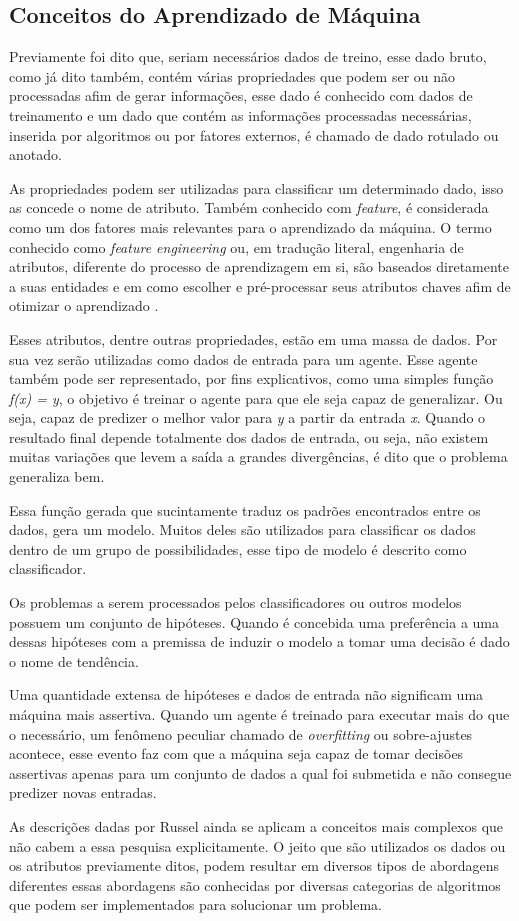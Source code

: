 \subsection{Conceitos do Aprendizado de Máquina}
Previamente foi dito que, seriam necessários dados de treino, esse dado bruto, como já dito também, contém várias propriedades que podem ser ou não processadas afim de gerar informações, esse dado é conhecido com dados de treinamento e um dado que contém as informações processadas necessárias, inserida por algoritmos ou por fatores externos, é chamado de dado rotulado ou anotado.

As propriedades podem ser utilizadas para classificar um determinado dado, isso as concede o nome de atributo. Também conhecido com \textit{feature}, é considerada como um dos fatores mais relevantes para o aprendizado da máquina. O termo conhecido como \textit{feature engineering} ou, em tradução literal, engenharia de atributos, diferente do processo de aprendizagem em si, são baseados diretamente a suas entidades e em como escolher e pré-processar seus atributos chaves afim de otimizar o aprendizado \cite{domingos2012few}.

Esses atributos, dentre outras propriedades, estão em uma massa de dados. Por sua vez serão utilizadas como dados de entrada para um agente. Esse agente também pode ser representado, por fins explicativos, como uma simples função \textit{f(x) = y}, o objetivo é treinar o agente para que ele seja capaz de generalizar. Ou seja, capaz de predizer o melhor valor para \textit{y} a partir da entrada \textit{x}. Quando o resultado final depende totalmente dos dados de entrada, ou seja, não existem muitas variações que levem a saída a grandes divergências, é dito que o problema generaliza bem.

Essa função gerada que sucintamente traduz os padrões encontrados entre os dados, gera um modelo. Muitos deles são utilizados para classificar os dados dentro de um grupo de possibilidades, esse tipo de modelo é descrito como classificador.

Os problemas a serem processados pelos classificadores ou outros modelos possuem um conjunto de  hipóteses. Quando é concebida uma preferência a uma dessas hipóteses com a premissa de induzir o modelo a tomar uma decisão é dado o nome de tendência.

Uma quantidade extensa de hipóteses e dados de entrada não significam uma máquina mais assertiva. Quando um agente é treinado para executar mais do que o necessário, um fenômeno peculiar chamado de \textit{overfitting} ou sobre-ajustes acontece, esse evento faz com que a máquina seja capaz de tomar decisões assertivas apenas para um conjunto de dados a qual foi submetida e não consegue predizer novas entradas.

As descrições dadas por Russel \cite[693]{russell2003artificial} ainda se aplicam a conceitos mais complexos que não cabem a essa pesquisa explicitamente. O jeito que são utilizados os dados ou os atributos previamente ditos, podem resultar em diversos tipos de abordagens diferentes essas abordagens são conhecidas por diversas categorias de algoritmos que podem ser implementados para solucionar um problema.
